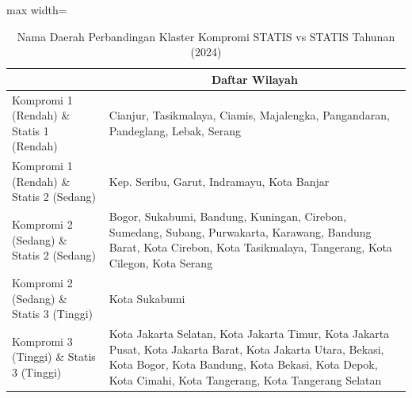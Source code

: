 \begin{table}[H]
\centering
\caption{Nama Daerah Perbandingan Klaster Kompromi STATIS vs STATIS Tahunan (2024)} \label{tab:app1comp_statis_name_2024}
\begin{adjustbox}{max width=\textwidth}
\begin{tabular}{|>{\centering\arraybackslash}p{4cm}|p{10cm}|}
\hline
\multicolumn{1}{|c|}{\textbf{Kategori}} & \multicolumn{1}{c|}{\textbf{Daftar Wilayah}} \\
\hline
Kompromi 1 (Rendah) \& Statis 1 (Rendah) & Cianjur, Tasikmalaya, Ciamis, Majalengka, Pangandaran, Pandeglang, Lebak, Serang \\
\hline
Kompromi 1 (Rendah) \& Statis 2 (Sedang) & Kep. Seribu, Garut, Indramayu, Kota Banjar \\
\hline
Kompromi 2 (Sedang) \& Statis 2 (Sedang) & Bogor, Sukabumi, Bandung, Kuningan, Cirebon, Sumedang, Subang, Purwakarta, Karawang, Bandung Barat, Kota Cirebon, Kota Tasikmalaya, Tangerang, Kota Cilegon, Kota Serang \\
\hline
Kompromi 2 (Sedang) \& Statis 3 (Tinggi) & Kota Sukabumi \\
\hline
Kompromi 3 (Tinggi) \& Statis 3 (Tinggi) & Kota Jakarta Selatan, Kota Jakarta Timur, Kota Jakarta Pusat, Kota Jakarta Barat, Kota Jakarta Utara, Bekasi, Kota Bogor, Kota Bandung, Kota Bekasi, Kota Depok, Kota Cimahi, Kota Tangerang, Kota Tangerang Selatan \\
\hline
\end{tabular}
\end{adjustbox}
\end{table}